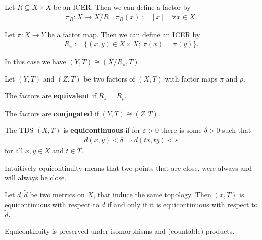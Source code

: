 \begin{frame}
	\begin{proposition}
		Let $R \subseteq X \times X$ be an ICER. Then we can define a factor by
		\begin{align*}
			\pi_R: X \to X/R \quad \pi_R(x) := [x] \quad \forall x \in X.
		\end{align*}
	
		Let $\pi: X \to Y$ be a factor map. Then we can define an ICER by
		\begin{align*}
			R_\pi := \{(x, y) \in X \times X;\ \pi(x) = \pi(y)\}.
		\end{align*}
	
		In this case we have $(Y, T) \cong (X/R_\pi, T)$.
	\end{proposition}
	\begin{definition}
		Let $(Y, T)$ and $(Z, T)$ be two factors of $(X, T)$ with factor maps $\pi$ and $\rho$.
		
		The factors are \textbf{equivalent} if $R_\pi = R_\rho$.
		
		The factors are \textbf{conjugated} if $(Y, T) \cong (Z, T)$.
	\end{definition}
\end{frame}

\begin{frame}
	\begin{definition}
		The TDS $(X, T)$ is \textbf{equicontinuous} if for $\varepsilon > 0$ there is some $\delta > 0$ such that
		\begin{align*}
			d(x, y) < \delta \Rightarrow d(tx, ty) < \varepsilon
		\end{align*}
		for all $x, y \in X$ and $t \in T$.
	\end{definition}
	\begin{remark}
		Intuitively equicontinuity means that two points that are close, were always and will always be close.
	\end{remark}
	\begin{proposition}
		Let $d, \tilde{d}$ be two metrics on $X$, that induce the same topology. Then $(x, T)$ is equicontinuous with respect to $d$ if and only if it is equicontinuous with respect to $\tilde{d}$.
	\end{proposition}
	\begin{proposition}
		Equicontinuity is preserved under isomorphisms and (countable) products. 
	\end{proposition}
\end{frame}

